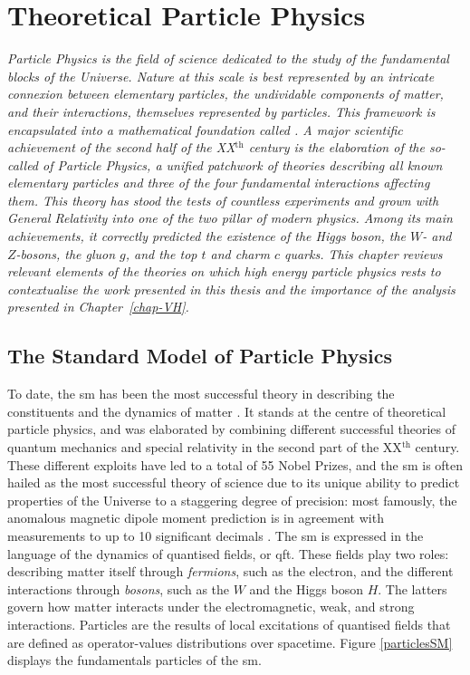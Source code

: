\chapter{\color{oxfordblue} Theoretical Particle Physics}\label{chap-theory}
\ChapFrame

\textit{Particle Physics is the field of science dedicated to the study of the fundamental blocks of the Universe. Nature at this scale is best represented by an intricate connexion between elementary particles, the undividable components of matter, and their interactions, themselves represented by particles. This framework is encapsulated into a mathematical foundation called . A major scientific achievement of the second half of the XX$^{\text{th}}$ century is the elaboration of the so-called  of Particle Physics, a unified patchwork of theories describing all known elementary particles and three of the four fundamental interactions affecting them. This theory has stood the tests of countless experiments and grown with General Relativity into one of the two pillar of modern physics. Among its main achievements, it correctly predicted the existence of the Higgs boson, the $W$- and $Z$-bosons, the gluon $g$, and the top $t$ and charm $c$ quarks. This chapter reviews relevant elements of the theories on which high energy particle physics rests to contextualise the work presented in this thesis and the importance of the analysis presented in Chapter~\ref{chap-VH}.}

\section{The Standard Model of Particle Physics}\label{Section:SM}
To date, the \gls{sm} has been the most successful theory in describing the constituents and the dynamics of matter \cite{SMphysics}. It stands at the centre of theoretical particle physics, and was elaborated by combining different successful theories of quantum mechanics and special relativity in the second part of the XX$^{\text{th}}$ century. These different exploits have led to a total of 55 Nobel Prizes, and the \gls{sm} is often hailed as the most successful theory of science due to its unique ability to predict properties of the Universe to a staggering degree of precision: most famously, the anomalous magnetic dipole moment prediction is in agreement with measurements to up to 10 significant decimals \cite{PhysRevA.83.052122}. The \gls{sm} is expressed in the language of the dynamics of quantised fields, or \gls{qft}. These fields play two roles: describing matter itself through \textit{fermions}, such as the electron, and the different interactions through \textit{bosons}, such as the $W$ and the Higgs boson $H$. The latters govern how matter interacts under the electromagnetic, weak, and strong interactions. Particles are the results of local excitations of quantised fields that are defined as operator-values distributions over spacetime. Figure \ref{particlesSM} displays the fundamentals particles of the \gls{sm}. \\

